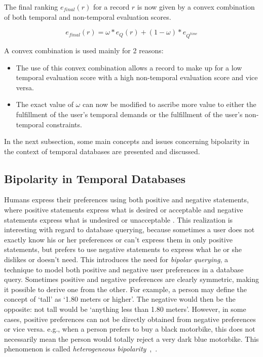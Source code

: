 
The final ranking $e_{final}(r)$ for a record $r$ is now given by a convex combination of both temporal and non-temporal evaluation scores.

\begin{equation}
\label{eq:convex-combination}
e_{final} \left( r \right) = \omega \ast e_{Q} \left( r \right) + \left( 1- \omega \right) \ast e_{Q^{time}}
\end{equation}

A convex combination is used mainly for 2 reasons:
\begin{itemize}
	\item The use of this convex combination allows a record to make up for a low temporal evaluation score with a high non-temporal evaluation score and vice versa.
	\item The exact value of $\omega$ can now be modified to ascribe more value to either the fulfillment of the user's temporal demands or the fulfillment of the user's non-temporal constraints.
\end{itemize}

In the next subsection, some main concepts and issues concerning bipolarity in the context of temporal databases are presented and discussed.

\subsection{Bipolarity in Temporal Databases}
\label{subsubsec:bipolarity}
Humans express their preferences using both positive and negative statements, where positive statements express what is desired or acceptable and negative statements express what is undesired or unacceptable \cite{Billiet:Pons:Matthe:DeTre:Pons:2011:BipolarFuzzy}. This realization is interesting with regard to database querying, because sometimes a user does not exactly know his or her preferences or can't express them in only positive statements, but prefers to use negative statements to express what he or she dislikes or doesn't need. This introduces the need for \emph{bipolar querying}, a technique to model both positive and negative user preferences in a database query. Sometimes positive and negative preferences are clearly symmetric, making it possible to derive one from the other. For example, a person may define the concept of `tall' as `1.80 meters or higher'. The negative would then be the opposite: not tall would be `anything less than 1.80 meters'. However, in some cases, positive preferences can not be directly obtained from negative preferences or vice versa. e.g., when a person prefers to buy a black motorbike, this does not necessarily mean the person would totally reject a very dark blue motorbike. This phenomenon is called \emph{heterogeneous bipolarity}~\cite{Dubois2006},~\cite{Dubois2008}.

